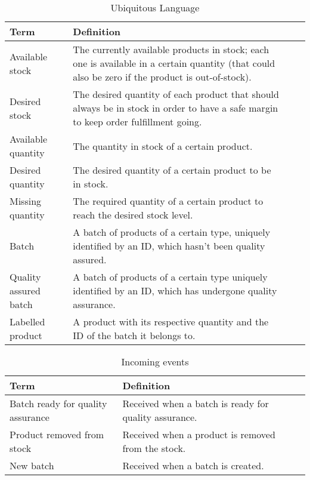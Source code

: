\begin{table}[H]
    \centering
    \begin{tabular}{p{}*{3}{>{\arraybackslash}p{}}}
    \hline
        Term & Definition \\ \hline
        Available stock & The currently available products in stock; each one is available in a certain quantity (that could also be zero if the product is out-of-stock). \\ \hline
        Desired stock & The desired quantity of each product that should always be in stock in order to have a safe margin to keep order fulfillment going. \\ \hline
        Available quantity & The quantity in stock of a certain product. \\ \hline
        Desired quantity & The desired quantity of a certain product to be in stock. \\ \hline
        Missing quantity & The required quantity of a certain product to reach the desired stock level. \\ \hline
        Batch & A batch of products of a certain type, uniquely identified by an ID, which hasn't been quality assured. \\ \hline
        Quality assured batch & A batch of products of a certain type uniquely identified by an ID, which has undergone quality assurance. \\ \hline
        Labelled product & A product with its respective quantity and the ID of the batch it belongs to. \\ \hline
    \end{tabular}
    \caption{Ubiquitous Language}
\end{table}

\begin{table}[H]
    \centering
    \begin{tabular}{p{}*{3}{>{\arraybackslash}p{}}}
    \hline
        Term & Definition \\ \hline
        Batch ready for quality assurance & Received when a batch is ready for quality assurance. \\ \hline
        Product removed from stock & Received when a product is removed from the stock. \\ \hline
        New batch & Received when a batch is created. \\ \hline
    \end{tabular}
    \caption{Incoming events}
\end{table}

